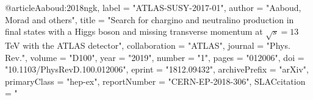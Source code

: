@article{Aaboud:2018ngk,
      label          = "ATLAS-SUSY-2017-01",
      author         = "Aaboud, Morad and others",
      title          = "{Search for chargino and neutralino production in final
                        states with a Higgs boson and missing transverse momentum
                        at $\sqrt{s} = 13$ TeV with the ATLAS detector}",
      collaboration  = "ATLAS",
      journal        = "Phys. Rev.",
      volume         = "D100",
      year           = "2019",
      number         = "1",
      pages          = "012006",
      doi            = "10.1103/PhysRevD.100.012006",
      eprint         = "1812.09432",
      archivePrefix  = "arXiv",
      primaryClass   = "hep-ex",
      reportNumber   = "CERN-EP-2018-306",
      SLACcitation   = "%
}

